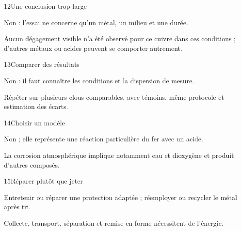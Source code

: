 \par\noindent\begin{minipage}{\linewidth}
\begin{corrige}{12}{Une conclusion trop large}
\begin{questions}
\item Non : l’essai ne concerne qu’un métal, un milieu et une durée.
\item Aucun dégagement visible n’a été observé pour ce cuivre dans ces conditions ; d’autres métaux ou acides peuvent se comporter autrement.
\end{questions}
\end{corrige}
\end{minipage}
\par\noindent\begin{minipage}{\linewidth}
\begin{corrige}{13}{Comparer des résultats}
\begin{questions}
\item Non : il faut connaître les conditions et la dispersion de mesure.
\item Répéter sur plusieurs clous comparables, avec témoins, même protocole et estimation des écarts.
\end{questions}
\end{corrige}
\end{minipage}
\par\noindent\begin{minipage}{\linewidth}
\begin{corrige}{14}{Choisir un modèle}
\begin{questions}
\item Non ; elle représente une réaction particulière du fer avec un acide.
\item La corrosion atmosphérique implique notamment eau et dioxygène et produit d’autres composés.
\end{questions}
\end{corrige}
\end{minipage}
\par\noindent\begin{minipage}{\linewidth}
\begin{corrige}{15}{Réparer plutôt que jeter}
\begin{questions}
\item Entretenir ou réparer une protection adaptée ; réemployer ou recycler le métal après tri.
\item Collecte, transport, séparation et remise en forme nécessitent de l’énergie.
\end{questions}
\end{corrige}
\end{minipage}
